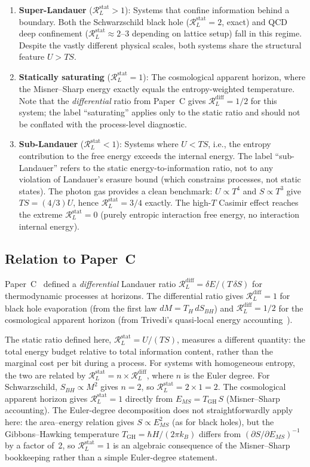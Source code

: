 \documentclass[%
 aip,
 amsmath,amssymb,
 reprint,%
]{revtex4-2}
\newcommand{\RLs}{\mathcal{R}_L^{\mathrm{stat}}}
\newcommand{\RLd}{\mathcal{R}_L^{\mathrm{diff}}}
\begin{document}
\begin{enumerate}
\item \textbf{Super-Landauer} ($\RLs > 1$): Systems that
confine information behind a boundary.  Both the Schwarzschild black
hole ($\RLs = 2$, exact) and QCD deep confinement
($\RLs \approx 2$--$3$ depending on lattice setup) fall in this
regime.  Despite the vastly different physical scales, both systems
share the structural feature $U > TS$.

\item \textbf{Statically saturating} ($\RLs = 1$):
The cosmological apparent horizon, where the Misner--Sharp energy
exactly equals the entropy-weighted temperature.  Note that the
\emph{differential} ratio from Paper~C gives $\RLd = 1/2$ for
this system; the label ``saturating'' applies only to the static
ratio and should not be conflated with the process-level diagnostic.

\item \textbf{Sub-Landauer} ($\RLs < 1$): Systems where $U < TS$,
i.e., the entropy contribution to the free energy exceeds the
internal energy.  The label ``sub-Landauer'' refers to the static
energy-to-information ratio, not to any violation of Landauer's
erasure bound (which constrains processes, not static states).
The photon gas provides a clean benchmark: $U \propto T^4$ and
$S \propto T^3$ give $TS = (4/3)U$, hence $\RLs = 3/4$ exactly.
The high-$T$ Casimir effect reaches the extreme $\RLs = 0$
(purely entropic interaction free energy, no interaction internal
energy).
\end{enumerate}

\subsection{Relation to Paper~C}

Paper~C~\cite{Rahnama2026BlackHole} defined a \emph{differential}
Landauer ratio $\mathcal{R}_L^{\mathrm{diff}} = \delta E/(T\,\delta S)$
for thermodynamic processes at horizons.  The differential ratio gives
$\mathcal{R}_L^{\mathrm{diff}} = 1$ for black hole evaporation
(from the first law $dM = T_H\,dS_{BH}$) and
$\mathcal{R}_L^{\mathrm{diff}} = 1/2$ for the cosmological apparent
horizon (from Trivedi's quasi-local energy
accounting~\cite{Trivedi2024}).

The static ratio defined here, $\RLs = U/(TS)$, measures a
different quantity: the total energy budget relative to total
information content, rather than the marginal cost per bit during a
process.  For systems with homogeneous entropy, the two are related
by $\RLs = n \times \RLd$, where $n$ is the Euler degree.  For
Schwarzschild, $S_{BH} \propto M^2$ gives $n = 2$, so
$\RLs = 2 \times 1 = 2$.  The cosmological apparent horizon
gives $\RLs = 1$ directly from $E_{MS} = T_{\mathrm{GH}}\,S$
(Misner--Sharp accounting).  The Euler-degree decomposition
does not straightforwardly apply here: the area--energy relation
gives $S \propto E_{MS}^2$ (as for black holes), but the
Gibbons--Hawking temperature $T_{\mathrm{GH}} = \hbar H/(2\pi k_B)$
differs from $(\partial S/\partial E_{MS})^{-1}$ by a factor of~2,
so $\RLs = 1$ is an algebraic consequence of the Misner--Sharp
bookkeeping rather than a simple Euler-degree statement.
\end{document}
